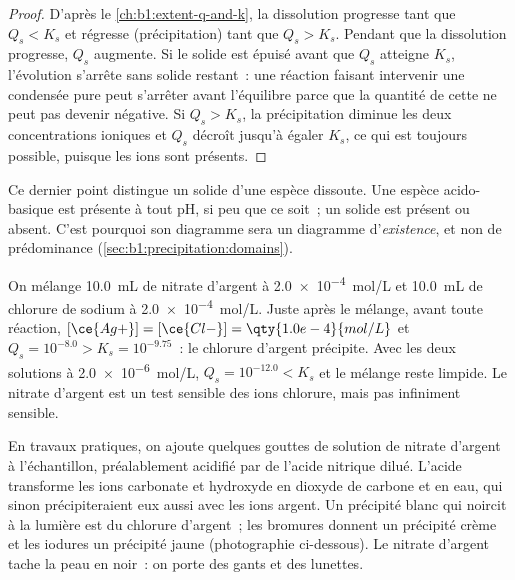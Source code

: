 \begin{proof}
D'après le \cref{ch:b1:extent-q-and-k}, la dissolution progresse tant
que $Q_s < K_s$ et régresse (précipitation) tant que $Q_s > K_s$. Pendant
que la dissolution progresse, $Q_s$ augmente. Si le solide est épuisé
avant que $Q_s$ atteigne $K_s$, l'évolution s'arrête sans solide
restant~: une réaction faisant intervenir une  condensée pure peut
s'arrêter avant l'équilibre parce que la quantité de cette  ne peut
pas devenir négative. Si $Q_s > K_s$, la précipitation diminue les deux
concentrations ioniques et $Q_s$ décroît jusqu'à égaler $K_s$, ce qui
est toujours possible, puisque les ions sont présents.
\end{proof}

Ce dernier point distingue un solide d'une espèce dissoute. Une espèce
acido-basique est présente à tout pH, si peu que ce soit~; un solide
est présent ou absent. C'est pourquoi son diagramme sera un diagramme
d'\emph{existence}, et non de prédominance
(\cref{sec:b1:precipitation:domains}).

\begin{example}\label{ex:b1:precipitation:mixing}
On mélange \qty{10.0}{mL} de nitrate d'argent à \qty{2.0e-4}{mol/L} et
\qty{10.0}{mL} de chlorure de sodium à \qty{2.0e-4}{mol/L}. Juste après
le mélange, avant toute réaction, $[\ce{Ag+}] = [\ce{Cl-}] = \qty{1.0e-4}{mol/L}$
et $Q_s = 10^{-8.0} > K_s = 10^{-9.75}$~: le chlorure d'argent
précipite. Avec les deux solutions à \qty{2.0e-6}{mol/L}, $Q_s = 10^{-12.0} < K_s$ et le
mélange reste limpide. Le nitrate d'argent est un test sensible des ions
chlorure, mais pas infiniment sensible.
\end{example}

\begin{inthelab}
En travaux pratiques, on ajoute quelques gouttes de solution de nitrate
d'argent à l'échantillon, préalablement acidifié par de l'acide nitrique
dilué. L'acide transforme les ions carbonate et hydroxyde en dioxyde de
carbone et en eau, qui sinon précipiteraient eux aussi avec les ions
argent. Un précipité blanc qui noircit à la lumière est du chlorure
d'argent~; les bromures donnent un précipité crème et les iodures un
précipité jaune (photographie ci-dessous). Le nitrate d'argent tache la
peau en noir~: on porte des gants et des lunettes.
\end{inthelab}

